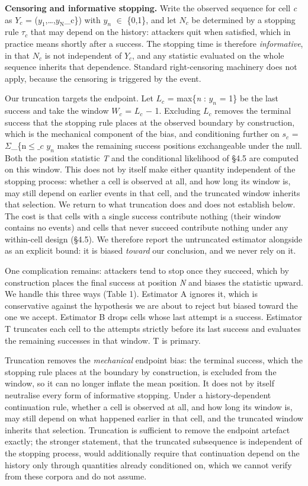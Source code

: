 \documentclass[conference]{IEEEtran}
\begin{document}
\textbf{Censoring and informative stopping.} Write the observed sequence for cell \textit{c} as $Y_{c}$ = ($y_{\mathrm{1}}$,\ldots,$y_{\mathrm{N}}$\_c\}) with $y_{n}$ $\in$ \{0,1\}, and let $N_{c}$ be determined by a stopping rule \textit{$\tau_{c}$} that may depend on the history: attackers quit when satisfied, which in practice means shortly after a success. The stopping time is therefore \textit{informative}, in that $N_{c}$ is not independent of $Y_{c}$, and any statistic evaluated on the whole sequence inherits that dependence. Standard right-censoring machinery does not apply, because the censoring is triggered by the event.

Our truncation targets the endpoint. Let $L_{c}$ = max\{\textit{n} : $y_{n}$ = 1\} be the last success and take the window $W_{c}$ = $L_{c}$ $-$ 1. Excluding $L_{c}$ removes the terminal success that the stopping rule places at the observed boundary by construction, which is the mechanical component of the bias, and conditioning further on $s_{c}$ = $\Sigma$\_\{n$\le$$\_{c}$ $y_{n}$ makes the remaining success positions exchangeable under the null. Both the position statistic \textit{T} and the conditional likelihood of \S4.5 are computed on this window. This does not by itself make either quantity independent of the stopping process: whether a cell is observed at all, and how long its window is, may still depend on earlier events in that cell, and the truncated window inherits that selection. We return to what truncation does and does not establish below. The cost is that cells with a single success contribute nothing (their window contains no events) and cells that never succeed contribute nothing under any within-cell design (\S4.5). We therefore report the untruncated estimator alongside as an explicit bound: it is biased \textit{toward} our conclusion, and we never rely on it.

One complication remains: attackers tend to stop once they succeed, which by construction places the final success at position \textit{N} and biases the statistic upward. We handle this three ways (Table 1). Estimator A ignores it, which is conservative against the hypothesis we are about to reject but biased toward the one we accept. Estimator B drops cells whose last attempt is a success. Estimator T truncates each cell to the attempts strictly before its last success and evaluates the remaining successes in that window. T is primary.

Truncation removes the \textit{mechanical} endpoint bias: the terminal success, which the stopping rule places at the boundary by construction, is excluded from the window, so it can no longer inflate the mean position. It does not by itself neutralise every form of informative stopping. Under a history-dependent continuation rule, whether a cell is observed at all, and how long its window is, may still depend on what happened earlier in that cell, and the truncated window inherits that selection. Truncation is sufficient to remove the endpoint artefact exactly; the stronger statement, that the truncated subsequence is independent of the stopping process, would additionally require that continuation depend on the history only through quantities already conditioned on, which we cannot verify from these corpora and do not assume.
\end{document}
